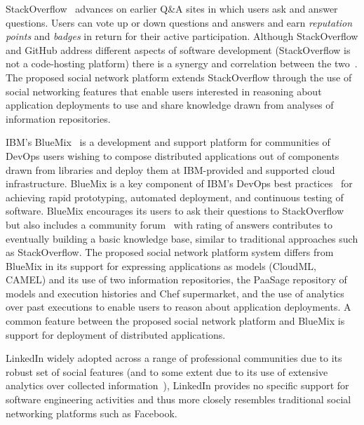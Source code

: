 StackOverflow~\cite{stackoverflow} advances on earlier Q\&A sites in which users ask and answer questions. Users can vote up or down questions and answers and earn \emph{reputation points} and \emph{badges} in return for their active participation. 
Although StackOverflow and GitHub address different aspects of software development (StackOverflow is not a code-hosting platform) there is a synergy and correlation between the two~\cite{stackgit}. The proposed social network platform extends StackOverflow through the use of social networking features that enable users interested in reasoning about application deployments to use and share knowledge drawn from analyses of information repositories.
 
IBM's BlueMix~\cite{Bluemix-dev} is a development and support platform for communities of DevOps users wishing to compose distributed applications out of components drawn from libraries and deploy them at IBM-provided and supported cloud infrastructure.  BlueMix is a key component of IBM's DevOps best practices~\cite{ibm-devops} for achieving rapid prototyping, automated deployment, and continuous testing of software. BlueMix encourages its users to ask their questions to StackOverflow but also includes a community forum~\cite{Bluemix-dev} with rating of answers contributes to eventually building a basic knowledge base, similar to traditional approaches such as StackOverflow.  The proposed social network platform system differs from BlueMix in its support for expressing applications as models (CloudML, CAMEL) and its use of two information repositories, the PaaSage repository of models and execution histories and Chef supermarket, and the use of analytics over past executions to enable users to reason about application deployments. A common feature between the proposed social network platform and BlueMix is support for deployment of distributed applications. 

LinkedIn widely adopted across a range of professional communities due to its robust set of social features (and to some extent due to its use of extensive analytics over collected information~\cite{sumbaly2013big}), LinkedIn provides no specific support for software engineering activities and thus more closely resembles traditional social networking platforms such as Facebook.



